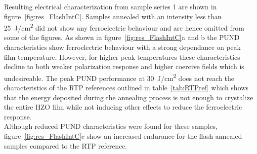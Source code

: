 \documentclass[11pt]{article}
\begin{document}
    Resulting electrical characterization from sample series 1 are shown in figure~\ref{fig:res_FlashIntC}. Samples annealed with an intensity less than \SI{25}{\joule/\centi\meter^2} did not show any ferroelectric behaviour and are hence omitted from some of the figures. As shown in figure~\ref{fig:res_FlashIntC}a and b the PUND characteristics show ferroelectric behaviour with a strong dependance on peak film temperature. However, for higher peak temperatures these characteristics decline to both weaker polarization response and higher coercive fields which is undesireable. The peak PUND performance at \SI{30}{\joule/\centi\meter^2} does not reach the characteristics of the RTP references outlined in table~\ref{tab:RTPref} which shows that the energy deposited during the annealing process is not enough to crystalize the entire HZO film while not inducing other effects to reduce the ferroelectric response.\\

    Although reduced PUND characteristics were found for these samples, figure~\ref{fig:res_FlashIntC}c show an increased endurance for the flash annealed samples compared to the RTP reference.
\end{document}
